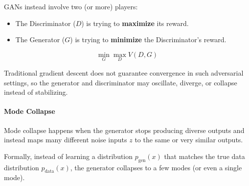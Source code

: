 \documentclass[11pt]{article}
\begin{document}
\medskip

GANs instead involve two (or more) players:
\begin{itemize}
	\item The Discriminator ($D$) is trying to \textbf{maximize} its reward.
	\item The Generator ($G$) is trying to \textbf{minimize} the Discriminator's reward.
\end{itemize}

\[
	\min_G \max_D V(D, G)
\]

Traditional gradient descent does not guarantee convergence in such adversarial settings,
so the generator and discriminator may oscillate, diverge, or collapse instead of stabilizing.

\paragraph*{Mode Collapse}
Mode collapse happens when the generator stops producing diverse outputs and instead maps many different noise inputs $z$ to the same or very similar outputs.

Formally, instead of learning a distribution $p_{\text{gen}}(x)$ that matches the true data distribution $p_{\text{data}}(x)$, 
the generator collapses to a few modes (or even a single mode).
\end{document}
